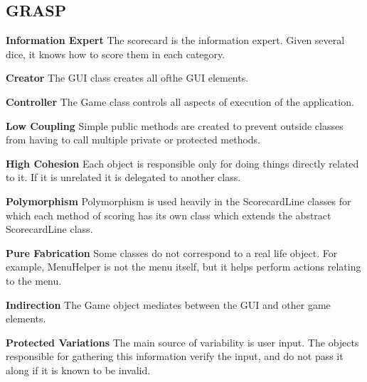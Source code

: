 \documentclass[12pt]{article}
\begin{document}
\subsection*{GRASP}
\begin{list}{}{}
\item \textbf{Information Expert}\newline
The scorecard is the information expert.  Given several dice, it knows how to score them in each category.

\item \textbf{Creator}\newline
The GUI class creates all ofthe GUI elements.

\item \textbf{Controller}\newline
The Game class controls all aspects of execution of the application.

\item \textbf{Low Coupling}\newline
Simple public methods are created to prevent outside classes from having to call multiple private or protected methods.

\item \textbf{High Cohesion}\newline
Each object is responsible only for doing things directly related to it.  If it is unrelated it is delegated to another class.

\item \textbf{Polymorphism}\newline
Polymorphism is used heavily in the ScorecardLine classes for which each method of scoring has its own class which extends the abstract ScorecardLine class.

\item \textbf{Pure Fabrication}\newline
Some classes do not correspond to a real life object.  For example, MenuHelper is not the menu itself, but it helps perform actions relating to the menu.

\item \textbf{Indirection}\newline
The Game object mediates between the GUI and other game elements.

\item \textbf{Protected Variations}\newline
The main source of variability is user input.  The objects responsible for gathering this information verify the input, and do not pass it along if it is known to be invalid.

\end{list}
\end{document}

